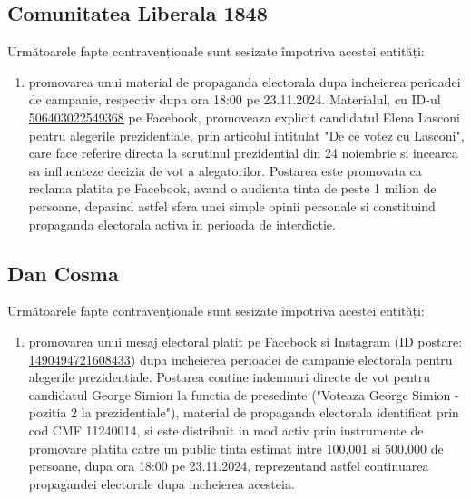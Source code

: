 \documentclass[a4paper,12pt]{article}
\begin{document}
\vspace{0.5cm}

\subsection{Comunitatea Liberala 1848}
Următoarele fapte contravenționale sunt sesizate împotriva acestei entități:

\begin{enumerate}[leftmargin=*, label=\arabic*.)]
    \item promovarea unui material de propaganda electorala dupa incheierea perioadei de campanie, respectiv dupa ora 18:00 pe 23.11.2024. Materialul, cu ID-ul \href{https://www.facebook.com/ads/library/?id=506403022549368}{506403022549368} pe Facebook, promoveaza explicit candidatul Elena Lasconi pentru alegerile prezidentiale, prin articolul intitulat "De ce votez cu Lasconi", care face referire directa la scrutinul prezidential din 24 noiembrie si incearca sa influenteze decizia de vot a alegatorilor. Postarea este promovata ca reclama platita pe Facebook, avand o audienta tinta de peste 1 milion de persoane, depasind astfel sfera unei simple opinii personale si constituind propaganda electorala activa in perioada de interdictie.
\end{enumerate}

\vspace{0.5cm}

\subsection{Dan Cosma}
Următoarele fapte contravenționale sunt sesizate împotriva acestei entități:

\begin{enumerate}[leftmargin=*, label=\arabic*.)]
    \item promovarea unui mesaj electoral platit pe Facebook si Instagram (ID postare: \href{https://www.facebook.com/ads/library/?id=1490494721608433}{1490494721608433}) dupa incheierea perioadei de campanie electorala pentru alegerile prezidentiale. Postarea contine indemnuri directe de vot pentru candidatul George Simion la functia de presedinte ("Voteaza George Simion - pozitia 2 la prezidentiale"), material de propaganda electorala identificat prin cod CMF 11240014, si este distribuit in mod activ prin instrumente de promovare platita catre un public tinta estimat intre 100,001 si 500,000 de persoane, dupa ora 18:00 pe 23.11.2024, reprezentand astfel continuarea propagandei electorale dupa incheierea acesteia.
\end{enumerate}
\end{document}

